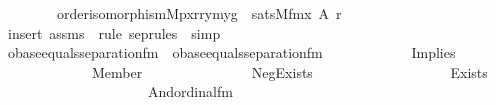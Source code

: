 \begin{isabellebody}
\ \ \ \ \ \ \ \ order{\isacharunderscore}{\kern0pt}isomorphism{\isacharparenleft}{\kern0pt}{\isacharhash}{\kern0pt}{\isacharhash}{\kern0pt}M{\isacharcomma}{\kern0pt}pxr{\isacharcomma}{\kern0pt}r{\isacharcomma}{\kern0pt}y{\isacharcomma}{\kern0pt}my{\isacharcomma}{\kern0pt}g{\isacharparenright}{\kern0pt}{\isacharparenright}{\kern0pt}{\isacharparenright}{\kern0pt}{\isacharparenright}{\kern0pt}\ {\isasymlongleftrightarrow}\ sats{\isacharparenleft}{\kern0pt}M{\isacharcomma}{\kern0pt}{\isacharquery}{\kern0pt}fm{\isacharcomma}{\kern0pt}{\isacharbrackleft}{\kern0pt}x{\isacharcomma}{\kern0pt}\ A{\isacharcomma}{\kern0pt}\ r{\isacharbrackright}{\kern0pt}{\isacharparenright}{\kern0pt}{\isachardoublequoteclose}\ \isanewline
%
\isadelimproof
\ \ %
\endisadelimproof
%
\isatagproof
{}\isamarkupfalse%
\ {\isacharparenleft}{\kern0pt}insert\ assms\ {\isacharsemicolon}{\kern0pt}\ {\isacharparenleft}{\kern0pt}rule\ sep{\isacharunderscore}{\kern0pt}rules\ {\isacharbar}{\kern0pt}\ simp{\isacharparenright}{\kern0pt}{\isacharplus}{\kern0pt}{\isacharparenright}{\kern0pt}%
\endisatagproof
{\isafoldproof}%
%
\isadelimproof
\ \isanewline
%
\endisadelimproof
\isanewline
{}\isamarkupfalse%
\ obase{\isacharunderscore}{\kern0pt}equals{\isacharunderscore}{\kern0pt}separation{\isacharunderscore}{\kern0pt}fm\ \ {\isachardoublequoteopen}obase{\isacharunderscore}{\kern0pt}equals{\isacharunderscore}{\kern0pt}separation{\isacharunderscore}{\kern0pt}fm\ {\isasymequiv}\ \isanewline
\ \ \ \ \ \ \ \ \ \ Implies\isanewline
\ \ \ \ \ \ \ \ \ \ \ \ \ {\isacharparenleft}{\kern0pt}Member{\isacharparenleft}{\kern0pt}{}{\isacharcomma}{\kern0pt}\ {}{\isacharparenright}{\kern0pt}{\isacharcomma}{\kern0pt}\isanewline
\ \ \ \ \ \ \ \ \ \ \ \ \ \ Neg{\isacharparenleft}{\kern0pt}Exists\isanewline
\ \ \ \ \ \ \ \ \ \ \ \ \ \ \ \ \ \ \ {\isacharparenleft}{\kern0pt}Exists\isanewline
\ \ \ \ \ \ \ \ \ \ \ \ \ \ \ \ \ \ \ \ \ {\isacharparenleft}{\kern0pt}And{\isacharparenleft}{\kern0pt}ordinal{\isacharunderscore}{\kern0pt}fm{\isacharparenleft}{\kern0pt}{}{\isacharparenright}{\kern0pt}{\isacharcomma}{\kern0pt}\isanewline

\end{isabellebody}
